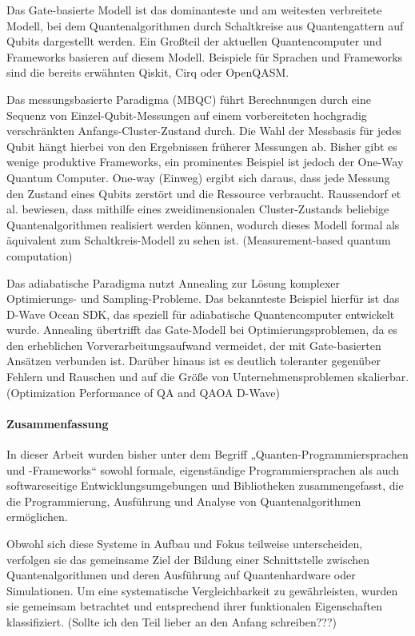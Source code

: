 Das Gate-basierte Modell ist das dominanteste und am weitesten verbreitete Modell, bei dem Quantenalgorithmen durch Schaltkreise aus Quantengattern auf Qubits dargestellt werden. Ein Großteil der aktuellen Quantencomputer und Frameworks basieren auf diesem Modell. Beispiele für Sprachen und Frameworks sind die bereits erwähnten Qiskit, Cirq oder OpenQASM. 

Das messungsbasierte Paradigma (MBQC) führt Berechnungen durch eine Sequenz von Einzel-Qubit-Messungen auf einem vorbereiteten hochgradig verschränkten Anfangs-Cluster-Zustand durch. Die Wahl der Messbasis für jedes Qubit hängt hierbei von den Ergebnissen früherer Messungen ab. Bisher gibt es wenige produktive Frameworks, ein prominentes Beispiel ist jedoch der One-Way Quantum Computer. One-way (Einweg) ergibt sich daraus, dass jede Messung den Zustand eines Qubits zerstört und die Ressource verbraucht. Raussendorf et al. bewiesen, dass mithilfe eines zweidimensionalen Cluster-Zustands beliebige Quantenalgorithmen realisiert werden können, wodurch dieses Modell formal als äquivalent zum Schaltkreis-Modell zu sehen ist. (Measurement-based quantum computation)

Das adiabatische Paradigma nutzt Annealing zur Lösung komplexer Optimierungs- und Sampling-Probleme. Das bekannteste Beispiel hierfür ist das D-Wave Ocean SDK, das speziell für adiabatische Quantencomputer entwickelt wurde. Annealing übertrifft das Gate-Modell bei Optimierungsproblemen, da es den erheblichen Vorverarbeitungsaufwand vermeidet, der mit Gate-basierten Ansätzen verbunden ist. Darüber hinaus ist es deutlich toleranter gegenüber Fehlern und Rauschen und auf die Größe von Unternehmensproblemen skalierbar. (Optimization Performance of QA and QAOA D-Wave)

\paragraph{Zusammenfassung} 
In dieser Arbeit wurden bisher unter dem Begriff „Quanten-Programmiersprachen und -Frameworks“ sowohl formale, eigenständige Programmiersprachen als auch softwareseitige Entwicklungsumgebungen und Bibliotheken zusammengefasst, die die Programmierung, Ausführung und Analyse von Quantenalgorithmen ermöglichen.

Obwohl sich diese Systeme in Aufbau und Fokus teilweise unterscheiden, verfolgen sie das gemeinsame Ziel der Bildung einer Schnittstelle zwischen Quantenalgorithmen und deren Ausführung auf Quantenhardware oder Simulationen. Um eine systematische Vergleichbarkeit zu gewährleisten, wurden sie gemeinsam betrachtet und entsprechend ihrer funktionalen Eigenschaften klassifiziert. (Sollte ich den Teil lieber an den Anfang schreiben???)

